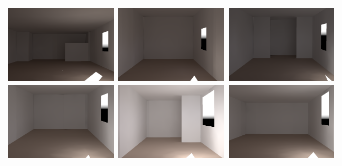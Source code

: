 \documentclass[review]{vgtc}                 %
\begin{document}
\begin{figure}[t]
\includegraphics[width=1.1in]{images/renderings/ground_truth/mrc331_camera_dark_march_crop.png} \hfill %
\includegraphics[width=1.1in]{images/renderings/renovations/065_camera_dark_march_crop.png} \hfill %
\includegraphics[width=1.1in]{images/renderings/renovations/038_camera_dark_march_crop.png} \hfill %
\includegraphics[width=1.1in]{images/renderings/renovations/042_camera_dark_march_crop.png} \hfill %
\includegraphics[width=1.1in]{images/renderings/renovations/031_camera_dark_march_crop.png} \hfill %
\includegraphics[width=1.1in]{images/renderings/renovations/014_camera_dark_march_crop.png} \\ %

\vspace{-2.04in}
\begin{minipage}{1.1in}~{\color{white}{\bf ground-truth}}\end{minipage} \hfill
\begin{minipage}{1.1in}~{\color{white}{\bf A1}}\end{minipage} \hfill
\begin{minipage}{1.1in}~{\color{white}{\bf A2}}\end{minipage} \hfill
\begin{minipage}{1.1in}~{\color{white}{\bf A3}}\end{minipage} \hfill
\begin{minipage}{1.1in}~{\color{white}{\bf A4}}\end{minipage} \hfill
\begin{minipage}{1.1in}~{\color{white}{\bf A5}}\end{minipage} \\
\vspace{1.67in}


\end{figure}
\end{document}
